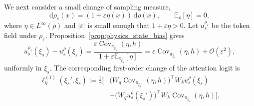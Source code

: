 We next consider a small change of sampling measure,
\begin{equation}
    \mathrm{d}\rho_{\varepsilon}(x)
    =(1+\varepsilon\eta(x))\,\mathrm{d}\rho(x),
    \qquad
    \mathbb{E}_{\rho}[\eta]=0,
    \label{eq:app_continuous_measure_path}
\end{equation}
where $\eta\in L^{\infty}(\rho)$ and $|\varepsilon|$ is small enough that $1+\varepsilon\eta>0$. Let $u_s^{\rho_{\varepsilon}}$ be the token field under $\rho_{\varepsilon}$. Proposition~\ref{prop:physics_state_bias} gives
\begin{equation}
    u_s^{\rho_{\varepsilon}}(\xi_s)-u_s^{\rho}(\xi_s)
    =\frac{\varepsilon\operatorname{Cov}_{\pi_{\xi_s}}(\eta,h)}
    {1+\varepsilon\mathbb{E}_{\pi_{\xi_s}}[\eta]}
    =\varepsilon\operatorname{Cov}_{\pi_{\xi_s}}(\eta,h)
    +\mathcal{O}(\varepsilon^2),
    \label{eq:app_continuous_exact_token_shift}
\end{equation}
uniformly in $\xi_s$. The corresponding first-order change of the attention logit is
\begin{align}
    \ell_{\eta}^{(1)}(\xi_s',\xi_s)
    :=\frac{1}{\tau}\Big[&
    \big(W_q\operatorname{Cov}_{\pi_{\xi_s'}}(\eta,h)\big)^{\top}
    W_ku_s^{\rho}(\xi_s)
    \nonumber\\
    &+\big(W_qu_s^{\rho}(\xi_s')\big)^{\top}
    W_k\operatorname{Cov}_{\pi_{\xi_s}}(\eta,h)\Big].
    \label{eq:app_first_order_logit_shift}
\end{align}

